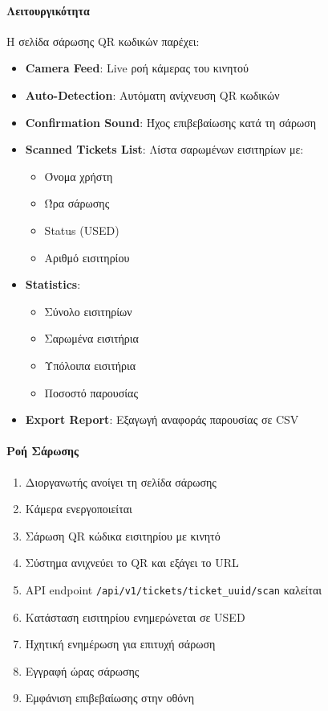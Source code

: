 \documentclass[12pt,a4paper]{report}
\begin{document}
\paragraph{Λειτουργικότητα}

Η σελίδα σάρωσης QR κωδικών παρέχει:
\begin{itemize}
    \item \textbf{Camera Feed}: Live ροή κάμερας του κινητού
    \item \textbf{Auto-Detection}: Αυτόματη ανίχνευση QR κωδικών
    \item \textbf{Confirmation Sound}: Ήχος επιβεβαίωσης κατά τη σάρωση
    \item \textbf{Scanned Tickets List}: Λίστα σαρωμένων εισιτηρίων με:
    \begin{itemize}
        \item Όνομα χρήστη
        \item Ώρα σάρωσης
        \item Status (USED)
        \item Αριθμό εισιτηρίου
    \end{itemize}
    \item \textbf{Statistics}:
    \begin{itemize}
        \item Σύνολο εισιτηρίων
        \item Σαρωμένα εισιτήρια
        \item Υπόλοιπα εισιτήρια
        \item Ποσοστό παρουσίας
    \end{itemize}
    \item \textbf{Export Report}: Εξαγωγή αναφοράς παρουσίας σε CSV
\end{itemize}

\paragraph{Ροή Σάρωσης}
\begin{enumerate}
    \item Διοργανωτής ανοίγει τη σελίδα σάρωσης
    \item Κάμερα ενεργοποιείται
    \item Σάρωση QR κώδικα εισιτηρίου με κινητό
    \item Σύστημα ανιχνεύει το QR και εξάγει το URL
    \item API endpoint \texttt{/api/v1/tickets/{ticket\_uuid}/scan} καλείται
    \item Κατάσταση εισιτηρίου ενημερώνεται σε USED
    \item Ηχητική ενημέρωση για επιτυχή σάρωση
    \item Εγγραφή ώρας σάρωσης
    \item Εμφάνιση επιβεβαίωσης στην οθόνη
\end{enumerate}
\end{document}
